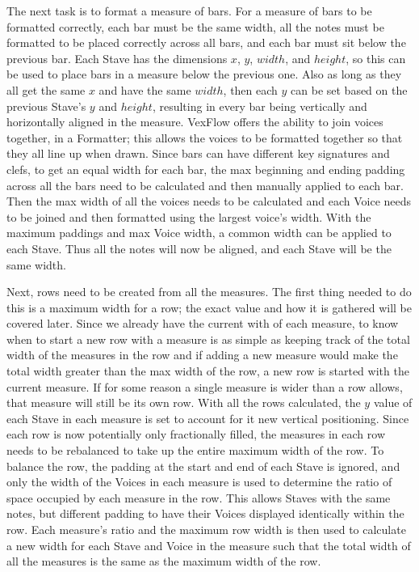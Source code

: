 \documentclass[letterpaper,12pt]{article}
\begin{document}
The next task is to format a measure of bars. For a measure of bars to be formatted correctly, each bar must be the same
width, all the notes must be formatted to be placed correctly across all bars, and each bar must sit below the previous
bar. Each Stave has the dimensions $ x $, $ y $, $ width $, and $ height $, so this can be used to place bars in a
measure below the previous one. Also as long as they all get the same $ x $ and have the same $ width $, then each $ y $
can be set based on the previous Stave's $ y $ and $ height $, resulting in every bar being vertically and horizontally
aligned in the measure. VexFlow offers the ability to join voices together, in a Formatter; this allows the voices to be
formatted together so that they all line up when drawn. Since bars can have different key signatures and clefs, to get
an equal width for each bar, the max beginning and ending padding across all the bars need to be calculated and then
manually applied to each bar. Then the max width of all the voices needs to be calculated and each Voice needs to be
joined and then formatted using the largest voice's width. With the maximum paddings and max Voice width, a common width
can be applied to each Stave. Thus all the notes will now be aligned, and each Stave will be the same width.

Next, rows need to be created from all the measures. The first thing needed to do this is a maximum width for a row; the
exact value and how it is gathered will be covered later. Since we already have the current with of each measure, to
know when to start a new row with a measure is as simple as keeping track of the total width of the measures in the row
and if adding a new measure would make the total width greater than the max width of the row, a new row is started with
the current measure. If for some reason a single measure is wider than a row allows, that measure will still be its own
row. With all the rows calculated, the $ y $ value of each Stave in each measure is set to account for it new vertical
positioning. Since each row is now potentially only fractionally filled, the measures in each row needs to be rebalanced
to take up the entire maximum width of the row. To balance the row, the padding at the start and end of each Stave is
ignored, and only the width of the Voices in each measure is used to determine the ratio of space occupied by each
measure in the row. This allows Staves with the same notes, but different padding to have their Voices displayed
identically within the row. Each measure's ratio and the maximum row width is then used to calculate a new width for
each Stave and Voice in the measure such that the total width of all the measures is the same as the maximum width of
the row.
\end{document}
